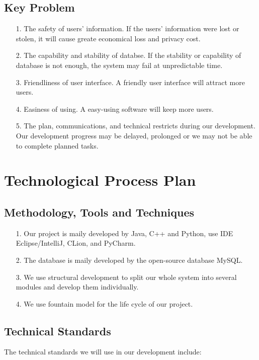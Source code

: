 \documentclass[10pt]{article}
\begin{document}
\subsection{Key Problem}
\begin{itemize}
	\item[1.] The safety of users' information. If the users' information were lost or stolen, it will cause greate economical loss and privacy cost.
	\item[2.] The capability and stability of databse. If the stability or capability of database is not enough, the system may fail at unpredictable time.
	\item[3.] Friendliness of user interface. A friendly user interface will attract more users.
	\item[4.] Easiness of using. A easy-using software will keep more users.
	\item[5.] The plan, communications, and technical restricts during our development. Our development progress may be delayed, prolonged or we may not be able to complete planned tasks.
\end{itemize}

\section{Technological Process Plan}
\subsection{Methodology, Tools and Techniques}
\begin{itemize}
	\item[1.] Our project is maily developed by Java, C++ and Python, use IDE Eclipse/IntelliJ, CLion, and PyCharm.
	\item[2.] The database is maily developed by the open-source database MySQL.
	\item[3.] We use structural development to split our whole system into several modules and develop them individually.
	\item[4.] We use fountain model for the life cycle of our project.
\end{itemize}

\subsection{Technical Standards}
The technical standards we will use in our development include:
\end{document}
